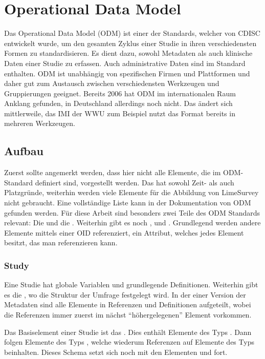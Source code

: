 \section{Operational Data Model}
\label{m:odm}

Das Operational Data Model (ODM) ist einer der Standards, welcher von CDISC entwickelt wurde, um den gesamten Zyklus einer Studie in ihren verschiedensten Formen zu standardisieren.
Es dient dazu, sowohl Metadaten als auch klinische Daten einer Studie zu erfassen. Auch administrative Daten sind im Standard enthalten.
ODM ist unabhängig von spezifischen Firmen und Plattformen und daher gut zum Austausch zwischen verschiedensten Werkzeugen und Gruppierungen geeignet.
Bereits 2006 hat ODM im internationalen Raum Anklang gefunden, in Deutschland allerdings noch nicht\cite{odm_art}.
Das ändert sich mittlerweile, das IMI der WWU zum Beispiel nutzt das Format bereits in mehreren Werkzeugen.

\subsection{Aufbau}

Zuerst sollte angemerkt werden, dass hier nicht alle Elemente, die im ODM-Standard definiert sind, vorgestellt werden. Das hat sowohl Zeit- als auch Platzgründe, weiterhin werden viele Elemente für die Abbildung von LimeSurvey nicht gebraucht.
Eine vollständige Liste kann in der Dokumentation von ODM gefunden werden. %
Für diese Arbeit sind besonders zwei Teile des ODM Standards relevant: Die  und die .
Weiterhin gibt es noch ,  und .
Grundlegend werden andere Elemente mittels einer OID referenziert, ein Attribut, welches jedes Element besitzt, das man referenzieren kann.

\subsubsection{Study}

Eine Studie hat globale Variablen und grundlegende Definitionen.
Weiterhin gibt es die , wo die Struktur der Umfrage festgelegt wird.
In der einer Version der Metadaten sind alle Elemente in Referenzen und Definitionen aufgeteilt, wobei die Referenzen immer zuerst im nächst \enquote{höhergelegenen} Element vorkommen.

Das Basiselement einer Studie ist das .
Dies enthält Elemente des Typs .
Dann folgen Elemente des Typs , welche wiederum Referenzen auf Elemente des Typs  beinhalten.
Dieses Schema setzt sich noch mit den Elementen  und  fort.

